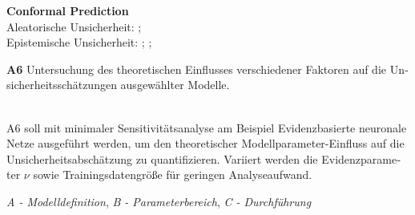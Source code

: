 \begin{otherlanguage}{ngerman}
{\begin{minipage}[t]{\textwidth}
\textbf{\gls{Conformal Prediction}}\\
Aleatorische Unsicherheit: \parencite[S.~4–5]{vovk2005algorithmic}; \parencite{angelopoulos2021gentle} \\
Epistemische Unsicherheit: \parencite{angelopoulos2021gentle}; \parencite[S.~63–65]{shafer2008tutorial}; \parencite{rasmussen2006gaussian}
\end{minipage}%
}


\pagebreak


\textbf{A6} Untersuchung des theoretischen Einflusses verschiedener Faktoren auf die Unsicherheitsschätzungen ausgewählter Modelle.
\par\noindent\\
A6 soll mit minimaler Sensitivitätsanalyse am Beispiel \gls{Evidenzbasierte neuronale Netze} ausgeführt werden, um den theoretischer Modellparameter-Einfluss auf die Unsicherheitsabschätzung zu quantifizieren. Variiert werden die Evidenzparameter $\nu$ sowie Trainingsdatengröße für geringen Analyseaufwand.



\textit{A - Modelldefinition}, \textit{B - Parameterbereich}, \textit{C - Durchführung}


\end{otherlanguage}
